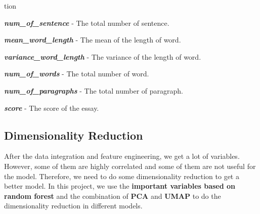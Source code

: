 tion\documentclass[8pt]{article}
\begin{document}
{\begin{compactitem}
    \item \textbf{\textit{num\_of\_sentence}} - The total number of sentence.
    \item \textbf{\textit{mean\_word\_length}} - The mean of the length of word.
    \item \textbf{\textit{variance\_word\_length}} - The variance of the length of word.
    \item \textbf{\textit{num\_of\_words}} - The total number of word.
    \item \textbf{\textit{num\_of\_paragraphs}} - The total number of paragraph.
    \item \textbf{\textit{score}} - The score of the essay.
\end{compactitem}
}

\subsection{Dimensionality Reduction}
After the data integration and feature engineering, we get a lot of variables.
However, some of them are highly correlated and some of them are not useful for the model.
Therefore, we need to do some dimensionality reduction to get a better model.
In this project, we use the \textbf{important variables based on random forest} and the combination of \textbf{PCA} and \textbf{UMAP} to do the dimensionality reduction in different models.
\end{document}
